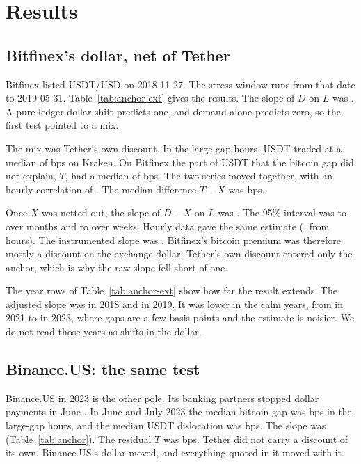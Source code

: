\documentclass[preprint,10pt]{elsarticle}
\begin{document}
\section{Results}
\subsection{Bitfinex's dollar, net of Tether}

Bitfinex listed USDT/USD on 2018-11-27. The stress window runs from that date to 2019-05-31. Table~\ref{tab:anchor-ext} gives the results. The slope of $D$ on $L$ was \NumKStressDaySlopeD{}. A pure ledger-dollar shift predicts one, and demand alone predicts zero, so the first test pointed to a mix.

The mix was Tether's own discount. In the large-gap hours, USDT traded at a median of \NumKStressMedX{} bps on Kraken. On Bitfinex the part of USDT that the bitcoin gap did not explain, $T$, had a median of \NumKStressMedT{} bps. The two series moved together, with an hourly correlation of \NumKStressCorrTX{}. The median difference $T-X$ was \NumKStressMedTmX{} bps.

Once $X$ was netted out, the slope of $D-X$ on $L$ was \NumKStressDaySlopeAdj{}. The 95\% interval was \NumKStressDaySlopeAdjMoLo{} to \NumKStressDaySlopeAdjMoHi{} over months and \NumKStressDaySlopeAdjWkLo{} to \NumKStressDaySlopeAdjWkHi{} over weeks. Hourly data gave the same estimate (\NumKStressHrSlopeAdj{}, from \NumKStressHrN{} hours). The instrumented slope was \NumKStressDayIvAdj{}. Bitfinex's bitcoin premium was therefore mostly a discount on the exchange dollar. Tether's own discount entered only the anchor, which is why the raw slope fell short of one.

The year rows of Table~\ref{tab:anchor-ext} show how far the result extends. The adjusted slope was \NumKYTwoZeroOneEightDaySlopeAdj{} in 2018 and \NumKYTwoZeroOneNineDaySlopeAdj{} in 2019. It was lower in the calm years, from \NumKYTwoZeroTwoOneDaySlopeAdj{} in 2021 to \NumKYTwoZeroTwoThreeDaySlopeAdj{} in 2023, where gaps are a few basis points and the estimate is noisier. We do not read those years as shifts in the dollar.

\subsection{Binance.US: the same test}

Binance.US in 2023 is the other pole. Its banking partners stopped dollar payments in June \citep{theblock2023binanceus}. In June and July 2023 the median bitcoin gap was \NumUAnchorBnusL{} bps in the large-gap hours, and the median USDT dislocation was \NumUAnchorBnusD{} bps. The slope was \NumUAnchorBnusSlope{} (Table~\ref{tab:anchor}). The residual $T$ was \NumUAnchorBnusT{} bps. Tether did not carry a discount of its own. Binance.US's dollar moved, and everything quoted in it moved with it.
\end{document}

